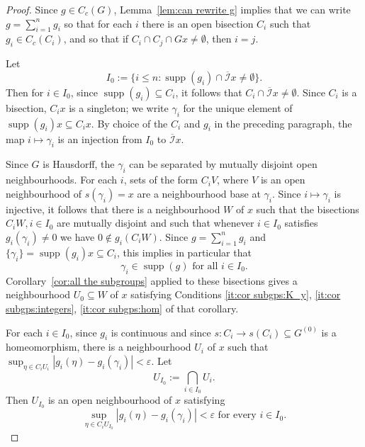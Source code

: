 \documentclass[a4paper, 12pt]{amsart}
\theoremstyle{plain}
\theoremstyle{definition}
\theoremstyle{remark}
\newcommand{\supp}{\operatorname{supp}}
\newcommand{\Iicl}{\overline{\mathcal{I}}}
\numberwithin{equation}{section}
\begin{document}
\begin{proof}
Since $g \in C_c(G)$, Lemma~\ref{lem:can rewrite g} implies that we can write
$g = \sum^n_{i=1} g_i$ so that for each $i$ there is an open bisection $C_i$
such that $g_i \in C_c(C_i)$, and so that if $C_i \cap C_j \cap Gx \not=
\emptyset$, then $i = j$.

Let
\[
I_0 := \{i \le n : \supp(g_i) \cap \Iicl x \not= \emptyset\}.
\]
Then for $i \in I_0$, since $\supp(g_i) \subseteq C_i$, it follows that $C_i
\cap \Iicl x \not= \emptyset$. Since $C_i$ is a bisection, $C_i x$ is a
singleton; we write $\gamma_i$ for the unique element of $\supp(g_i)x
\subseteq C_i x$. By choice of the $C_i$ and $g_i$ in the preceding
paragraph, the map $i \mapsto \gamma_i$ is an injection from $I_0$ to $\Iicl
x$.

Since $G$ is Hausdorff, the $\gamma_i$ can be separated by mutually disjoint
open neighbourhoods. For each $i$, sets of the form $C_i V$, where $V$ is an
open neighbourhood of $s(\gamma_i) = x$ are a neighbourhood base at
$\gamma_i$. Since $i \mapsto \gamma_i$ is injective, it follows that there is
a neighbourhood $W$ of $x$ such that the bisections $C_i W, i \in I_0$ are
mutually disjoint \label{page:C_i W mutually disjoint} and such that whenever
$i \in I_0$ satisfies $g_i(\gamma_i) \not= 0$ we have $0 \not\in g_i(C_i W)$.
Since $g=\sum_{i=1}^{n}g_i$ and $\{\gamma_i\}=\supp(g_i)x\subseteq C_i$, this
implies in particular that
\begin{equation}\label{eq:gamma_i in supp(g)}
    \gamma_i\in \supp(g) \text{ for all }i\in I_0.
\end{equation}
Corollary~\ref{cor:all the subgroups} applied to these
bisections gives a neighbourhood $U_0 \subseteq W$ of $x$ satisfying
Conditions \ref{it:cor subgps:K_y}, \ref{it:cor subgps:integers}, \ref{it:cor
subgps:hom} of that corollary.

For each $i \in I_0$, since $g_i$ is continuous and since $s \colon C_i \to s(C_i)
\subseteq G^{(0)}$ is a homeomorphism, there is a neighbourhood $U_i$ of $x$
such that $\sup_{\eta \in C_i U_i} |g_i(\eta) - g_i(\gamma_i)| <
\varepsilon$.
Let
\[
    U_{I_0} := \bigcap_{i \in I_0} U_i.
\]
Then $U_{I_0}$ is an open neighbourhood of $x$ satisfying
\begin{equation}\label{eq:norm control}
	\sup_{\eta \in C_i U_{I_0}} |g_i(\eta) - g_i(\gamma_i)| < \varepsilon
	\text{ for every } i\in I_0.
\end{equation}


\end{proof}
\end{document}
